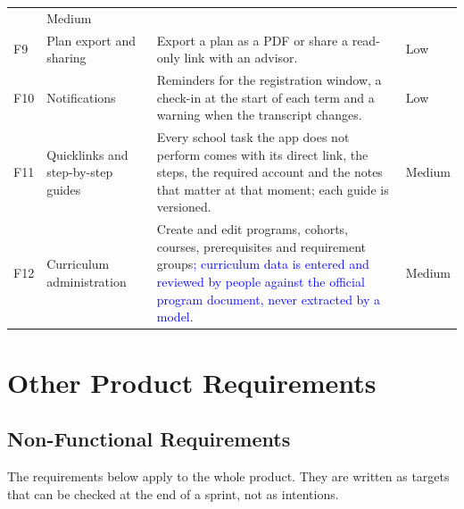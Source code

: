 \documentclass{article}
\begin{document}
{\begin{xltabular}{\dimexpr{}\tabcolsep\relax}{@{}p{0.9cm}p{3.9cm}Yp{1.4cm}@{}}
& Medium\\
F9 & Plan export and sharing & Export a plan as a PDF or share a read-only link with an advisor. & Low\\
F10 & Notifications &
Reminders for the registration window, a check-in at the start of each term and a warning when the transcript changes. &
Low\\
F11 & Quicklinks and step-by-step guides &
Every school task the app does not perform comes with its direct link, the steps, the required account and the notes that
matter at that moment; each guide is versioned. & Medium\\
F12 & Curriculum administration &
Create and edit programs, cohorts, courses, prerequisites and requirement groups\textcolor{blue}{; curriculum data is entered and reviewed by people against the official
program document, never extracted by a model}. & Medium\\
\end{xltabular}}

\section{Other Product Requirements}
\subsection{Non-Functional Requirements}
The requirements below apply to the whole product. They are written as targets that can be checked at the end of a sprint,
not as intentions.
\end{document}
